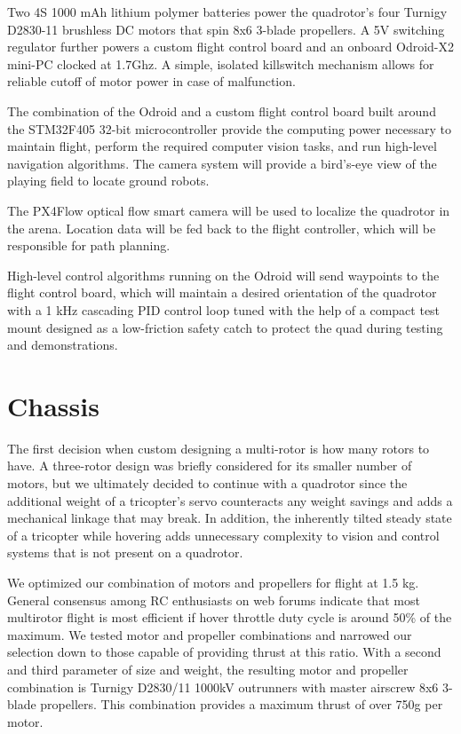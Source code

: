 \documentclass[12pt,letterpaper]{article} \usepackage[margin=1in]{geometry}
\begin{document}
Two 4S 1000 mAh lithium polymer batteries power the quadrotor's four Turnigy
D2830-11 brushless DC motors that spin 8x6 3-blade propellers. A 5V switching
regulator further powers a custom flight control board and an onboard Odroid-X2
mini-PC clocked at 1.7Ghz. A simple, isolated killswitch mechanism allows for
reliable cutoff of motor power in case of malfunction.

The combination of the Odroid and a custom flight control board built around the
STM32F405 32-bit microcontroller provide the computing power necessary to
maintain flight, perform the required computer vision tasks, and run high-level
navigation algorithms. The camera system will provide a bird's-eye view of the
playing field to locate ground robots.

The PX4Flow optical flow smart camera will be used to localize the quadrotor in
the arena. Location data will be fed back to the flight controller, which will
be responsible for path planning.

High-level control algorithms running on the Odroid will send waypoints to the
flight control board, which will maintain a desired orientation of the quadrotor
with a 1 kHz cascading PID control loop tuned with the help of a compact test
mount designed as a low-friction safety catch to protect the quad during testing
and demonstrations.


\section*{Chassis}

The first decision when custom designing a multi-rotor is how many rotors to
have. A three-rotor design was briefly considered for its smaller number of
motors, but we ultimately decided to continue with a quadrotor since the
additional weight of a tricopter's servo counteracts any weight savings and
adds a mechanical linkage that may break. In addition, the inherently tilted
steady state of a tricopter while hovering adds unnecessary complexity to
vision and control systems that is not present on a quadrotor.

We optimized our combination of motors and propellers for flight at 1.5 kg.
General consensus among RC enthusiasts on web forums indicate that most
multirotor flight is most efficient if hover throttle duty cycle is around 50\%
of the maximum. We tested motor and propeller combinations and narrowed our
selection down to those capable of providing thrust at this ratio. With
a second and third parameter of size and weight, the resulting motor and
propeller combination is Turnigy D2830/11 1000kV outrunners with master
airscrew 8x6 3-blade propellers. This combination provides a maximum thrust of
over 750g per motor.
\end{document}
